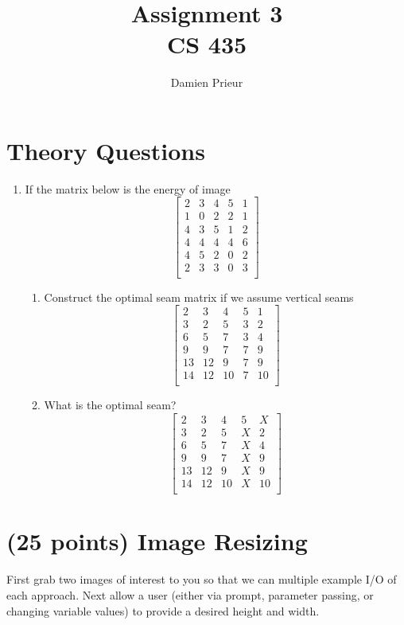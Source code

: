 \documentclass{article}
\author{Damien Prieur}
\title{Assignment 3 \\ CS 435}
\date{}
\begin{document}
\maketitle

\section{Theory Questions}
\begin{enumerate}
\item If the matrix below is the energy of image
$$
\begin{bmatrix}
2&	3&	4&	5&	1\\
1&	0&	2&	2&	1\\
4&	3&	5&	1&	2\\
4&	4&	4&	4&	6\\
4&	5&	2&	0&	2\\
2&	3&	3&	0&	3\\
\end{bmatrix}
$$

\begin{enumerate}
\item Construct the optimal seam matrix if we assume vertical seams
$$
\begin{bmatrix}
2&	3&	4&	5&	1\\
3&	2&	5&	3&	2\\
6&	5&	7&	3&	4\\
9&	9&	7&	7&	9\\
13&	12&	9&	7&	9\\
14&	12&	10&	7&	10\\
\end{bmatrix}
$$
\item What is the optimal seam?
$$
\begin{bmatrix}
2&	3&	4&	5&	X\\
3&	2&	5&	X&	2\\
6&	5&	7&	X&	4\\
9&	9&	7&	X&	9\\
13&	12&	9&	X&	9\\
14&	12&	10&	X&	10\\
\end{bmatrix}
$$
\end{enumerate}
\end{enumerate}

\newpage
\section{(25 points) Image Resizing}
First grab two images of interest to you so that we can multiple example I/O of each approach.   Next allow a user (either via prompt, parameter passing, or changing variable values) to provide a desired height and width.\\ 
\end{document}
